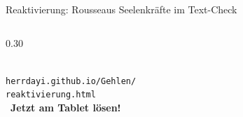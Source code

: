\documentclass[aspectratio=169, 10pt]{beamer}
\begin{document}
\begin{frame}{Reaktivierung: Rousseaus Seelenkräfte im Text-Check}
\begin{columns}[T]
        \begin{column}{0.30\textwidth}
            \centering
            \begin{tcolorbox}[enhanced, colframe=primaryBlue, colback=white, arc=3mm, boxrule=0.8pt, title={\faLaptopCode\ Digitale Übung}, fonttitle=\scriptsize\bfseries]
                \centering
                \\[0.15cm]
                \tiny\texttt{herrdayi.github.io/Gehlen/}\\[-0.05cm]
                \tiny\texttt{reaktivierung.html}
                \\[0.12cm]
                \scriptsize\faHandPointer\ \textbf{Jetzt am Tablet lösen!}
            \end{tcolorbox}
        \end{column}
    \end{columns}
\end{frame}
\end{document}
